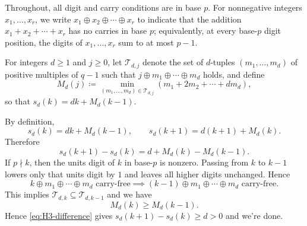 \documentclass[11pt]{amsart}
\begin{document}
Throughout, all digit and carry conditions are in base $p$.
For nonnegative integers $x_1,\ldots,x_r$, we write
$x_1\oplus x_2\oplus\cdots\oplus x_r$ to indicate that the addition
$x_1+x_2+\cdots+x_r$ has no carries in base $p$; equivalently,
at every base-$p$ digit position, the digits of $x_1,\ldots,x_r$ sum to at most $p-1$.

For integers $d\geq 1$ and $j\geq 0$, let $\mathcal{T}_{d,j}$ denote the set of
$d$-tuples $(m_1,\ldots,m_d)$ of positive multiples of $q-1$ such that
$j\oplus m_1\oplus\cdots\oplus m_d$ holds, and define
\[
  M_d(j) \coloneq \min_{(m_1,\ldots,m_d)\in\mathcal{T}_{d,j}}\left(m_1+2m_2+\cdots+dm_d\right),
\]
so that $s_d(k)=dk+M_d(k-1)$.

By definition,
\[
  s_d(k)=dk+M_d(k-1),
  \qquad
  s_d(k+1)=d(k+1)+M_d(k).
\]
Therefore
\begin{equation}\label{eq:H3-difference}
  s_d(k+1)-s_d(k)=d+M_d(k)-M_d(k-1).
\end{equation}
If $p\nmid k$, then the units digit of $k$ in base-$p$ is nonzero.
Passing from $k$ to $k-1$ lowers only that units digit by $1$ and leaves all higher digits unchanged.
Hence
\[
  k\oplus m_1\oplus\cdots\oplus m_d \text{ carry-free}
  \implies (k-1)\oplus m_1\oplus\cdots\oplus m_d \text{ carry-free}.
\]
This implies $\mathcal T_{d,k} \subseteq \mathcal T_{d,k-1}$ and we have
\[ M_d(k)\geq M_d(k-1).  \]
Hence \eqref{eq:H3-difference} gives $s_d(k+1)-s_d(k)\geq d>0$ and we're done.
\end{document}
